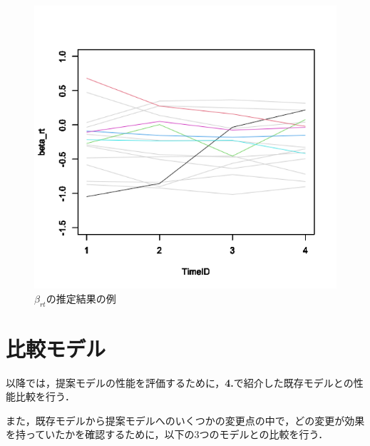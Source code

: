\documentclass[a4paper,11pt,oneside,openany]{jsbook}
\begin{document}
\begin{figure}[tb]
  \begin{center}
  \includegraphics[keepaspectratio]{img/beta_rt.png}
 \caption{$\beta_{rt}$の推定結果の例}\label{beta_rt_data}
\end{center}
\end{figure}




\newpage
\section{比較モデル}
以降では，提案モデルの性能を評価するために，\textbf{4.}で紹介した既存モデルとの性能比較を行う．

また，既存モデルから提案モデルへのいくつかの変更点の中で，どの変更が効果を持っていたかを確認するために，以下の3つのモデルとの比較を行う．
\end{document}
